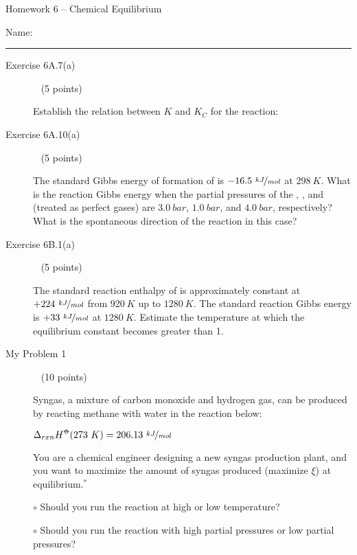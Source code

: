 \documentclass[12pt, openany, letterpaper]{memoir}
\begin{document}
\begin{center}
	{\large Homework 6 -- Chemical Equilibrium}
	
\end{center}

Name: \rule[-.1mm]{15em}{0.1pt}

\begin{description}	
	\item [Exercise 6A.7(a)] ~ (5 points)
	
	Establish the relation between $K$ and $K_C$ for the reaction: 
	
	\vspace{18em}
	\item [Exercise 6A.10(a)] ~ (5 points)
	
	The standard Gibbs energy of formation of  is $-16.5~\nicefrac{kJ}{mol}$ at $298~K$. What is the reaction Gibbs energy when the partial pressures of the , , and  (treated as perfect gases) are $3.0~bar$, $1.0~bar$, and $4.0~bar$, respectively? What is the spontaneous direction of the reaction in this case?
	
	\vspace{20em}
	\item [Exercise 6B.1(a)] ~ (5 points)
	
	The standard reaction enthalpy of  is approximately constant at $+224~\nicefrac{kJ}{mol}$ from $920~K$ up to $1280~K$. The standard reaction Gibbs energy is $+33~\nicefrac{kJ}{mol}$ at $1280~K$. Estimate the temperature at which the equilibrium constant becomes greater than 1.
	
	\vspace{20em}
	\item [My Problem 1] ~ (10 points)
	
	Syngas, a mixture of carbon monoxide and hydrogen gas, can be produced by reacting methane with water in the reaction below:
	
	 \hspace{2em} $\Delta_{rxn}H^{\std}(273~K)=206.13~\nicefrac{kJ}{mol}$
	
	\noindent You are a chemical engineer designing a new syngas production plant, and you want to maximize the amount of syngas produced (maximize $\xi$) at equilibrium.$^*$
	
	\noindent $\circ$ Should you run the reaction at high or low temperature?
	
	\vspace{7em}
	\noindent $\circ$ Should you run the reaction with high partial pressures or low partial pressures?


\end{description}
\end{document}
